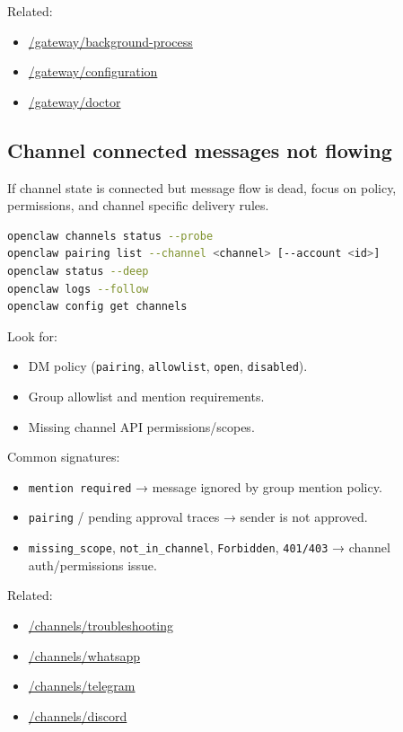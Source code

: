 Related:

\begin{itemize}
  \item \href{/gateway/background-process}{/gateway/background-process}
  \item \href{/gateway/configuration}{/gateway/configuration}
  \item \href{/gateway/doctor}{/gateway/doctor}
\end{itemize}


\subsection{Channel connected messages not flowing}


If channel state is connected but message flow is dead, focus on policy, permissions, and channel specific delivery rules.

\begin{lstlisting}[language=bash]
openclaw channels status --probe
openclaw pairing list --channel <channel> [--account <id>]
openclaw status --deep
openclaw logs --follow
openclaw config get channels
\end{lstlisting}


Look for:

\begin{itemize}
  \item DM policy (\texttt{pairing}, \texttt{allowlist}, \texttt{open}, \texttt{disabled}).
  \item Group allowlist and mention requirements.
  \item Missing channel API permissions/scopes.
\end{itemize}


Common signatures:

\begin{itemize}
  \item \texttt{mention required} → message ignored by group mention policy.
  \item \texttt{pairing} / pending approval traces → sender is not approved.
  \item \texttt{missing\_scope}, \texttt{not\_in\_channel}, \texttt{Forbidden}, \texttt{401/403} → channel auth/permissions issue.
\end{itemize}


Related:

\begin{itemize}
  \item \href{/channels/troubleshooting}{/channels/troubleshooting}
  \item \href{/channels/whatsapp}{/channels/whatsapp}
  \item \href{/channels/telegram}{/channels/telegram}
  \item \href{/channels/discord}{/channels/discord}
\end{itemize}


